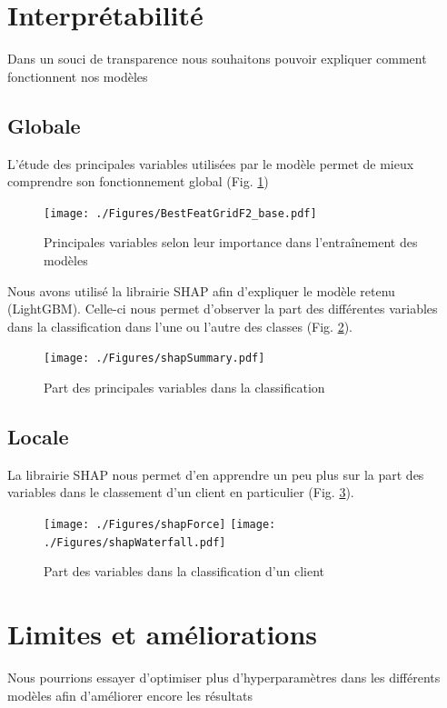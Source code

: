 \documentclass[12pt, a4paper]{article}
\begin{document}
\section{Interprétabilité}

Dans un souci de transparence nous souhaitons pouvoir expliquer comment fonctionnent nos modèles

\subsection{Globale}

L'étude des principales variables utilisées par le modèle permet de mieux comprendre son fonctionnement global (Fig. \ref{fig:BestFeat})

\begin{figure}[h]
    \begin{center}
        \texttt{[image: ./Figures/BestFeatGridF2\_base.pdf]}
    \end{center}
    \caption{Principales variables selon leur importance dans l'entraînement des modèles}
    \label{fig:BestFeat}
\end{figure}

Nous avons utilisé la librairie SHAP afin d'expliquer le modèle retenu (LightGBM). Celle-ci nous permet d'observer la part des différentes variables dans la classification dans l'une ou l'autre des classes (Fig. \ref{fig:shapSummary}).

\begin{figure}[h]
    \begin{center}
        \texttt{[image: ./Figures/shapSummary.pdf]}
    \end{center}
    \caption{Part des principales variables dans la classification}
    \label{fig:shapSummary}
\end{figure}

\subsection{Locale}

La librairie SHAP nous permet d'en apprendre un peu plus sur la part des variables dans le classement d'un client en particulier (Fig. \ref{fig:shapWaterfall}).

\begin{figure}[h]
    \begin{center}
        \texttt{[image: ./Figures/shapForce]}
        \texttt{[image: ./Figures/shapWaterfall.pdf]}
    \end{center}
    \caption{Part des variables dans la classification d'un client}
    \label{fig:shapWaterfall}
\end{figure}

\section{Limites et améliorations}

Nous pourrions essayer d'optimiser plus d'hyperparamètres dans les différents modèles afin d'améliorer encore les résultats
\end{document}
